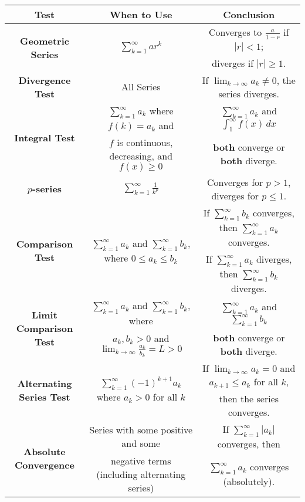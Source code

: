 \documentclass[12pt]{exam}
\begin{document}
{\scriptsize \centering {}\begin{tabular}{|c|c|c|}
\hline
{\bf Test} & {\bf When to Use} & {\bf Conclusion} \\
\hline

\multirow{2}{*}{{\bf Geometric Series}} & \multirow{2}{*}{$\sum_{k=1}^{\infty} ar^k$} & Converges to $\frac{a}{1-r}$ if $|r| < 1$; \\ & &diverges if $|r| \geq 1$. \\
\hline

{\bf Divergence Test} & All Series & If $\lim_{k \rightarrow \infty} a_k \neq 0$, the series diverges. \\
\hline

\multirow{2}{*}{{\bf Integral Test}} & $\sum_{k=1}^{\infty} a_k$ where $f(k) = a_k$ and & $\sum_{k = 1}^{\infty} a_k$ and $\int_1^\infty f(x) \, dx$ \\
&$f$ is continuous, decreasing, and $f(x) \geq 0$ & {\bf both} converge or {\bf both} diverge.\\
\hline

{\bf $p$-series} & $\sum_{k=1}^{\infty} \frac{1}{k^p}$ & Converges for $p > 1$, diverges for $p \leq 1$.\\
\hline

\multirow{2}{*}{{\bf Comparison Test}} & \multirow{2}{*}{$\sum_{k=1}^{\infty} a_k$ and $\sum_{k=1}^{\infty} b_k$, where $0 \leq a_k \leq b_k$} & If $\sum_{k=1}^{\infty} b_k$ converges, then $\sum_{k=1}^{\infty} a_k$ converges. \\ & & If $\sum_{k=1}^{\infty} a_k$ diverges, then $\sum_{k=1}^{\infty} b_k$ diverges.\\
\hline

\multirow{2}{*}{{\bf Limit Comparison Test}} & $\sum_{k=1}^{\infty} a_k$ and $\sum_{k=1}^{\infty} b_k$, where & $\sum_{k=1}^{\infty} a_k$ and $\sum_{k=1}^{\infty} b_k$ \\ & $a_k, b_k > 0$ and $\lim_{k\rightarrow \infty} \frac{a_k}{b_k} = L > 0$ & {\bf both} converge or {\bf both} diverge. \\
\hline

\multirow{2}{*}{{\bf Alternating Series Test}} & \multirow{2}{*}{$\sum_{k=1}^{\infty} \left(-1\right)^{k+1} a_k$ where $a_k > 0$ for all $k$} & If $\lim_{k \rightarrow \infty} a_k = 0$ and $a_{k+1} \leq a_k$ for all $k$, \\ & & then the series converges. \\
\hline

\multirow{2}{*}{{\bf Absolute Convergence}} & Series with some positive and some & If $\sum_{k=1}^{\infty} |a_k|$ converges, then\\
 & negative terms (including alternating series) & $\sum_{k=1}^{\infty} a_k$ converges (absolutely).\\
 \hline


\end{tabular}}
\end{document}

